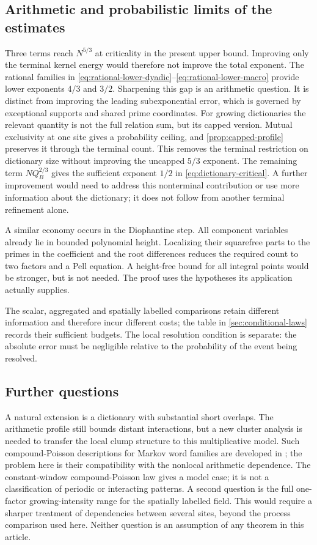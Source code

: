 \subsection{Arithmetic and probabilistic limits of the estimates}
Three terms reach $N^{5/3}$ at criticality in the present upper bound.
Improving only the terminal kernel energy would therefore not improve the
total exponent. The rational families in
\eqref{eq:rational-lower-dyadic}--\eqref{eq:rational-lower-macro} provide
lower exponents $4/3$ and $3/2$. Sharpening this gap is an arithmetic
question. It is distinct from improving the leading subexponential error,
which is governed by exceptional supports and shared prime coordinates.
For growing dictionaries the relevant quantity is not the full relation
sum, but its capped version. Mutual exclusivity at one site gives a
probability ceiling, and \cref{prop:capped-profile} preserves it through
the terminal count. This removes the terminal restriction on dictionary
size without improving the uncapped $5/3$ exponent. The remaining term
$NQ_B^{2/3}$ gives the sufficient exponent $1/2$ in
\eqref{eq:dictionary-critical}. A further improvement would need to
address this nonterminal contribution or use more information about the
dictionary; it does not follow from another terminal refinement alone.

A similar economy occurs in the Diophantine step. All component variables
already lie in bounded polynomial height. Localizing their squarefree
parts to the primes in the coefficient and the root differences reduces
the required count to two factors and a Pell equation. A height-free bound
for all integral points would be stronger, but is not needed. The proof
uses the hypotheses its application actually supplies.

The scalar, aggregated and spatially labelled comparisons retain different
information and therefore incur different costs; the table in
\cref{sec:conditional-laws} records their sufficient budgets. The local
resolution condition is separate: the absolute error must be negligible
relative to the probability of the event being resolved.

\subsection{Further questions}
A natural extension is a dictionary with substantial short overlaps.
The arithmetic profile still bounds distant interactions, but a new
cluster analysis is needed to transfer the local clump structure to
this multiplicative model. Such compound-Poisson descriptions for
Markov word families are developed in
\cite{ReinertSchbath1998,RoquainSchbath2007}; the problem here is their
compatibility with the nonlocal arithmetic dependence.
The constant-window compound-Poisson law gives a model case; it is not a
classification of periodic or interacting patterns. A second question is
the full one-factor growing-intensity range for the spatially labelled
field. This would require a sharper treatment of dependencies between
several sites, beyond the process comparison used here. Neither question
is an assumption of any theorem in this article.

